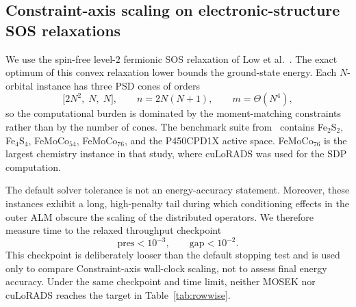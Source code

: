 \documentclass[11pt]{article}
\theoremstyle{definition}
\theoremstyle{remark}
\begin{document}
\subsection{Constraint-axis scaling on electronic-structure SOS relaxations}
\label{subsec:rowwise}

We use the spin-free level-$2$ fermionic SOS relaxation of Low
et al.~\cite[Appendix~G]{low2025fast}.  The exact optimum of this convex
relaxation lower bounds the ground-state energy.  Each $N$-orbital instance
has three PSD cones of orders
\begin{equation}
  \bigl[2N^2,\;N,\;N\bigr],
  \qquad n=2N(N+1),
  \qquad m=\Theta(N^4),
  \label{eq:chemistry-sos-size}
\end{equation}
so the computational burden is dominated by the moment-matching constraints
rather than by the number of cones.  The benchmark suite from~\cite{low2025fast}
contains Fe$_2$S$_2$, Fe$_4$S$_4$, FeMoCo$_{54}$, FeMoCo$_{76}$, and the
P450CPD1X active space.  FeMoCo$_{76}$ is the largest chemistry instance in
that study, where cuLoRADS was used for the SDP computation.

The default solver tolerance is not an energy-accuracy statement.  Moreover,
these instances exhibit a long, high-penalty tail during which conditioning
effects in the outer ALM obscure the scaling of the distributed operators.  We
therefore measure time to the relaxed throughput checkpoint
\begin{equation}
  \mathrm{pres}<10^{-3},
  \qquad
  \mathrm{gap}<10^{-2}.
  \label{eq:chemistry-scaling-checkpoint}
\end{equation}
This checkpoint is deliberately looser than the default stopping test and is
used only to compare Constraint-axis wall-clock scaling, not to assess final
energy accuracy.  Under the same checkpoint and time limit, neither
MOSEK nor cuLoRADS reaches the target in Table~\ref{tab:rowwise}.
\end{document}
